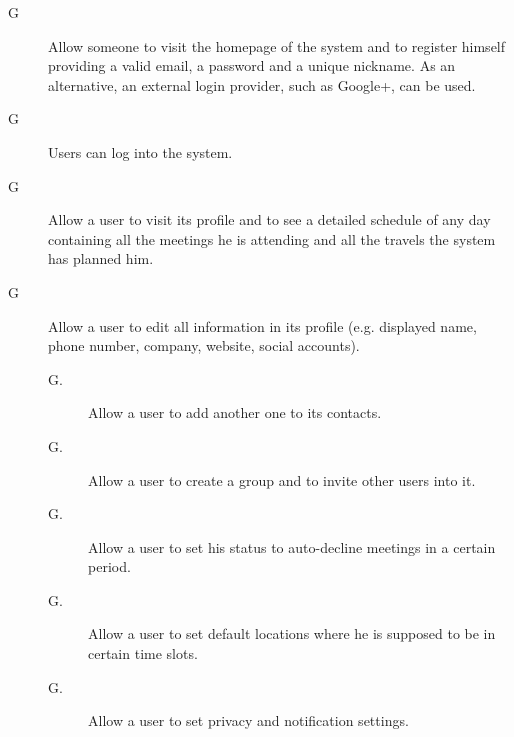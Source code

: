 
\begin{description}
\item[G\thecount\label{goal:Registration}] Allow someone to visit the homepage of the system and to register himself providing a valid email, a password and a unique nickname. As an alternative, an external login provider, such as Google+, can be used.

\setcounter{countin}{1}

\item[G\thecount\label{goal:Login}] Users can log into the system.

\setcounter{countin}{1}

\item[G\thecount\label{goal:SeeSchedule}] Allow a user to visit its profile and to see a detailed schedule of any day containing all the meetings he is attending and all the travels the system has planned him.

\setcounter{countin}{1}

\item[G\thecount\label{goal:EditProfile}] Allow a user to edit all information in its profile (e.g. displayed name, phone number, company, website, social accounts).
\begin{description}
\item[G\thecount.\thecountin] Allow a user to add another one to its contacts.
\item[G\thecount.\thecountin] Allow a user to create a group and to invite other users into it.
\item[G\thecount.\thecountin] Allow a user to set his status to auto-decline meetings in a certain period.
\item[G\thecount.\thecountin] Allow a user to set default locations where he is supposed to be in certain time slots.
\item[G\thecount.\thecountin] Allow a user to set privacy and notification settings.
\end{description}

\setcounter{countin}{1}


\end{description}

